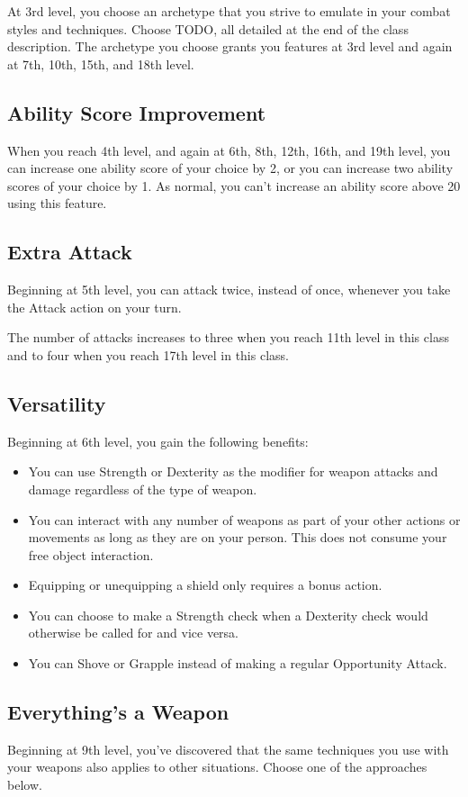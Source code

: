 At 3rd level, you choose an archetype that you strive to emulate in your combat styles and techniques. Choose TODO, all detailed at the end of the class description. The archetype you choose grants you features at 3rd level and again at 7th, 10th, 15th, and 18th level.

\subsection{Ability Score Improvement}

When you reach 4th level, and again at 6th, 8th, 12th, 16th, and 19th level, you can increase one ability score of your choice by 2, or you can increase two ability scores of your choice by 1. As normal, you can't increase an ability score above 20 using this feature.

\subsection{Extra Attack}

Beginning at 5th level, you can attack twice, instead of once, whenever you take the Attack action on your turn.

The number of attacks increases to three when you reach 11th level in this class and to four when you reach 17th level in this class.

\subsection{Versatility}
Beginning at 6th level, you gain the following benefits:
\begin{itemize}
	\item You can use Strength or Dexterity as the modifier for weapon attacks and damage regardless of the type of weapon.
	\item You can interact with any number of weapons as part of your other actions or movements as long as they are on your person. This does not consume your free object interaction.
	\item Equipping or unequipping a shield only requires a bonus action.
	\item You can choose to make a Strength check when a Dexterity check would otherwise be called for and vice versa.
	\item You can Shove or Grapple instead of making a regular Opportunity Attack.
\end{itemize} 

\subsection{Everything's a Weapon}
Beginning at 9th level, you've discovered that the same techniques you use with your weapons also applies to other situations. Choose one of the approaches below.

